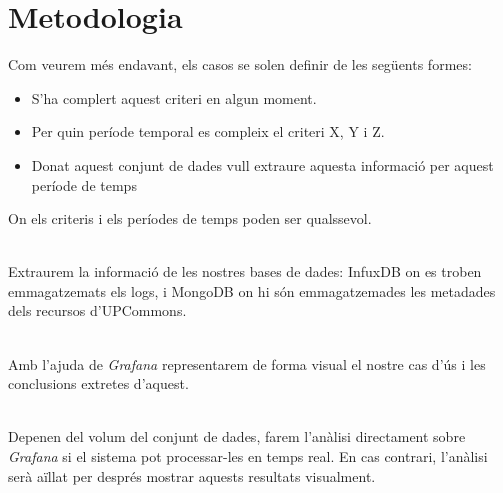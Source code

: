 \section{Metodologia}\label{sec:analysis-visualization-methodology}

\noindent
Com veurem més endavant, els casos se solen definir de les següents formes:

\begin{itemize}
    \item S'ha complert aquest criteri en algun moment.
    \item Per quin període temporal es compleix el criteri X, Y i Z.
    \item Donat aquest conjunt de dades vull extraure aquesta informació per aquest període de temps
\end{itemize}

\noindent
On els criteris i els períodes de temps poden ser qualssevol.

\noindent \\
Extraurem la informació de les nostres bases de dades: InfuxDB on es troben emmagatzemats els logs, i MongoDB on hi són emmagatzemades les metadades dels recursos d'\gls{UPCommons}.

\noindent \\
Amb l'ajuda de \textit{Grafana} representarem de forma visual el nostre cas d'ús i les conclusions extretes d'aquest.

\noindent \\
Depenen del volum del conjunt de dades,  farem l'anàlisi directament sobre \textit{Grafana} si el sistema pot processar-les en temps real.
En cas contrari, l'anàlisi serà aïllat per després mostrar aquests resultats visualment.

